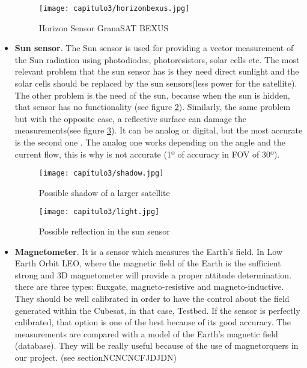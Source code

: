 \begin{itemize}
\begin{figure}[H]
	\centering
		\texttt{[image: capitulo3/horizonbexus.jpg]}
	\caption{Horizon Sensor GranaSAT BEXUS \cite{Gsat}}
	\label{fig:horizonbexus}
\end{figure}

\item \textbf{Sun sensor}. The Sun sensor is used for providing a vector measurement of the Sun radiation using photodiodes, photoresistors, solar cells etc.
The most relevant problem that the sun sensor has is they need direct sunlight and the solar cells should be replaced by the sun sensors(less power for the satellite). The other problem is the need of the sun, because when the sun is hidden, that sensor has no functionality (see figure \ref{fig:shadow}). Similarly, the same problem but with the opposite case, a reflective surface can damage the measurements(see figure \ref{fig:light}). It can be analog or digital, but the most accurate is the second one \cite{sunsensor}.
The analog one works depending on the angle and the current flow, this is why is not accurate (1º of accuracy in \acrshort{FOV} of 30º).

\begin{figure}[H]
	\centering
		\texttt{[image: capitulo3/shadow.jpg]}
	\caption{Possible shadow of a larger satellite \cite{sunsensor}}
	\label{fig:shadow}
\end{figure}


\begin{figure}[H]
	\centering
		\texttt{[image: capitulo3/light.jpg]}
	\caption{Possible reflection in the sun sensor \cite{sunsensor}}
	\label{fig:light}
\end{figure}

\item \textbf{Magnetometer}. It is a sensor which measures the Earth's field. In Low Earth Orbit \acrshort{LEO}, where the magnetic field of the Earth is the sufficient strong and \acrshort{3D} magnetometer will provide a proper attitude determination. there are three types: fluxgate, magneto-resistive and magneto-inductive. They should be well calibrated in order to have the control about the field generated within the Cubesat, in that case, Testbed. If the sensor is perfectly calibrated, that option is one of the best because of its good accuracy. The measurements are compared with a model of the Earth's magnetic field (database). They will be really useful because of the use of magnetorquers in our project. (see sectionNCNCNCFJDJDN)


\end{itemize}
